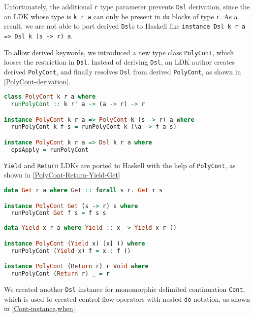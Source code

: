 Unfortunately, the additional \lstinline{r} type parameter prevents \lstinline{Dsl} derivation, since the an LDK whose type is \lstinline{k r a} can only be present in \lstinline{do} blocks of type \lstinline{r}. As a result, we are not able to port derived \lstinline{Dsl}s to Haskell like \lstinline{instance Dsl k r a => Dsl k (s -> r) a}.

To allow derived keywords, we introduced a new type class \lstinline{PolyCont}, which looses the restriction in \lstinline{Dsl}. Instead of deriving \lstinline{Dsl}, an LDK author creates derived \lstinline{PolyCont}, and finally resolves \lstinline{Dsl} from derived \lstinline{PolyCont}, as shown in \cref{PolyCont-derivation}.

\begin{lstlisting}[float=htbp,language={Haskell},caption={\lstinline{PolyCont} derivation},label={PolyCont-derivation}]
class PolyCont k r a where
  runPolyCont :: k r' a -> (a -> r) -> r

instance PolyCont k r a => PolyCont k (s -> r) a where
  runPolyCont k f s = runPolyCont k (\a -> f a s)

instance PolyCont k r a => Dsl k r a where
  cpsApply = runPolyCont
\end{lstlisting}

\lstinline{Yield} and \lstinline{Return} LDKs are ported to Haskell with the help of \lstinline{PolyCont}, as shown in \cref{PolyCont-Return-Yield-Get}

\begin{lstlisting}[float=htbp,language={Haskell},caption={\lstinline{PolyCont} instances for \lstinline{Get}, \lstinline{Yield} and \lstinline{Return}},label={PolyCont-Return-Yield-Get}]
data Get r a where Get :: forall s r. Get r s

instance PolyCont Get (s -> r) s where
  runPolyCont Get f s = f s s
  
data Yield x r a where Yield :: x -> Yield x r ()

instance PolyCont (Yield x) [x] () where
  runPolyCont (Yield x) f = x : f ()

instance PolyCont (Return r) r Void where
  runPolyCont (Return r) _ = r
\end{lstlisting}

We created another \lstinline{Dsl} instance for monomorphic delimited continuation \lstinline{Cont}, which is used to created control flow operators with nested \lstinline{do}-notation, as shown in \cref{Cont-instance,when}.

